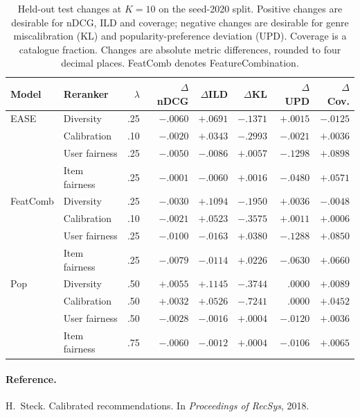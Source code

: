 \documentclass[12pt,a4paper]{article}   %
\begin{document}
\begin{table}[htbp]
\centering
\begingroup
\setlength{\tabcolsep}{3pt}
\begin{tabular}{llrrrrrr}
\toprule
Model & Reranker & $\lambda$
& $\Delta$nDCG & $\Delta$ILD & $\Delta$KL
& $\Delta$UPD & $\Delta$Cov. \\
\midrule
EASE & Diversity & .25
& $-.0060$ & $+.0691$ & $-.1371$ & $+.0015$ & $-.0125$ \\
& Calibration & .10
& $-.0020$ & $+.0343$ & $-.2993$ & $-.0021$ & $+.0036$ \\
& User fairness & .25
& $-.0050$ & $-.0086$ & $+.0057$ & $-.1298$ & $+.0898$ \\
& Item fairness & .25
& $-.0001$ & $-.0060$ & $+.0016$ & $-.0480$ & $+.0571$ \\
\midrule
FeatComb & Diversity & .25
& $-.0030$ & $+.1094$ & $-.1950$ & $+.0036$ & $-.0048$ \\
& Calibration & .10
& $-.0021$ & $+.0523$ & $-.3575$ & $+.0011$ & $+.0006$ \\
& User fairness & .25
& $-.0100$ & $-.0163$ & $+.0380$ & $-.1288$ & $+.0850$ \\
& Item fairness & .25
& $-.0079$ & $-.0114$ & $+.0226$ & $-.0630$ & $+.0660$ \\
\midrule
Pop & Diversity & .50
& $+.0055$ & $+.1145$ & $-.3744$ & $.0000$ & $+.0089$ \\
& Calibration & .50
& $+.0032$ & $+.0526$ & $-.7241$ & $.0000$ & $+.0452$ \\
& User fairness & .50
& $-.0028$ & $-.0016$ & $+.0004$ & $-.0120$ & $+.0036$ \\
& Item fairness & .75
& $-.0060$ & $-.0012$ & $+.0004$ & $-.0106$ & $+.0065$ \\
\bottomrule
\end{tabular}
\endgroup
\caption{Held-out test changes at $K=10$ on the
seed-2020 split. Positive changes are desirable for
nDCG, ILD and coverage; negative changes are desirable
for genre miscalibration (KL) and popularity-preference
deviation (UPD). Coverage is a catalogue fraction.
Changes are absolute metric differences, rounded
to four decimal places. FeatComb denotes
FeatureCombination.}
\label{tab:appendix-reranking}
\end{table}

\paragraph{Reference.}
H.~Steck. Calibrated recommendations.
In \emph{Proceedings of RecSys}, 2018.
\end{document}
